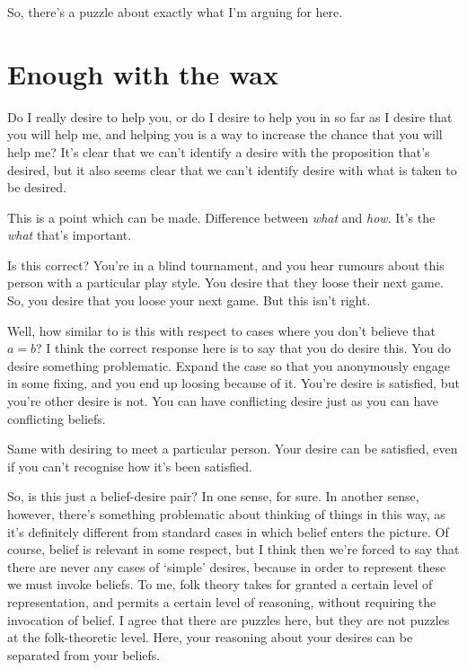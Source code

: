\documentclass[10pt]{article}
\begin{document}
So, there's a puzzle about exactly what I'm arguing for here.

\section{Enough with the wax}
\label{sec:enough-with-wax}


Do I really desire to help you, or do I desire to help you in so far as I desire that you will help me, and helping you is a way to increase the chance that you will help me?
It's clear that we can't identify a desire with the proposition that's desired, but it also seems clear that we can't identify desire with what is taken to be desired.

This is a point which can be made.
Difference between \emph{what} and \emph{how}.
It's the \emph{what} that's important.

Is this correct?
You're in a blind tournament, and you hear rumours about this person with a particular play style.
You desire that they loose their next game.
So, you desire that you loose your next game.
But this isn't right.

Well, how similar to is this with respect to cases where you don't believe that \(a = b\)?
I think the correct response here is to say that you do desire this.
You do desire something problematic.
Expand the case so that you anonymously engage in some fixing, and you end up loosing because of it.
You're desire is satisfied, but you're other desire is not.
You can have conflicting desire just as you can have conflicting beliefs.

Same with desiring to meet a particular person.
Your desire can be satisfied, even if you can't recognise how it's been satisfied.



So, is this just a belief-desire pair?
In one sense, for sure.
In another sense, however, there's something problematic about thinking of things in this way, as it's definitely different from standard cases in which belief enters the picture.
Of course, belief is relevant in some respect, but I think then we're forced to say that there are never any cases of `simple' desires, because in order to represent these we must invoke beliefs.
To me, folk theory takes for granted a certain level of representation, and permits a certain level of reasoning, without requiring the invocation of belief.
I agree that there are puzzles here, but they are not puzzles at the folk-theoretic level.
Here, your reasoning about your desires can be separated from your beliefs.
\end{document}
